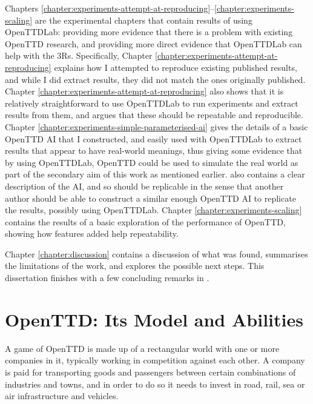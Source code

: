\documentclass[logo,msc,dsti]{style/infthesis}    %
\begin{document}
{Chapters \ref{chapter:experiments-attempt-at-reproducing}--\ref{chapter:experiments-scaling} are the experimental chapters that contain results of using OpenTTDLab: providing more evidence that there is a problem with existing OpenTTD research, and providing more direct evidence that OpenTTDLab can help with the 3Rs. Specifically, Chapter \ref{chapter:experiments-attempt-at-reproducing} explains how I attempted to reproduce existing published results, and while I did extract results, they did not match the ones originally published. Chapter \ref{chapter:experiments-attempt-at-reproducing} also shows that it is relatively straightforward to use OpenTTDLab to run experiments and extract results from them, and argues that these should be repeatable and reproducible. Chapter \ref{chapter:experiments-simple-parameterised-ai} gives the details of a basic OpenTTD AI that I constructed, and easily used with OpenTTDLab to extract results that appear to have real-world meanings, thus giving some evidence that by using OpenTTDLab, OpenTTD could be used to simulate the real world as part of the secondary aim of this work as mentioned earlier.  also contains a clear description of the AI, and so should be replicable in the sense that another author should be able to construct a similar enough OpenTTD AI to replicate the results, possibly using OpenTTDLab. Chapter \ref{chapter:experiments-scaling} contains the results of a basic exploration of the performance of OpenTTD, showing how features added help repeatability.

Chapter \ref{chapter:discussion} contains a discussion of what was found, summarises the limitations of the work, and explores the possible next steps. This dissertation finishes with a few concluding remarks in .

\chapter{OpenTTD: Its Model and Abilities}
\label{chapter:openttd-model-and-abilities}

A game of OpenTTD is made up of a rectangular world with one or more companies in it, typically working in competition against each other. A company is paid for transporting goods and passengers between certain combinations of industries and towns, and in order to do so it needs to invest in road, rail, sea or air infrastructure and vehicles.

}
\end{document}
